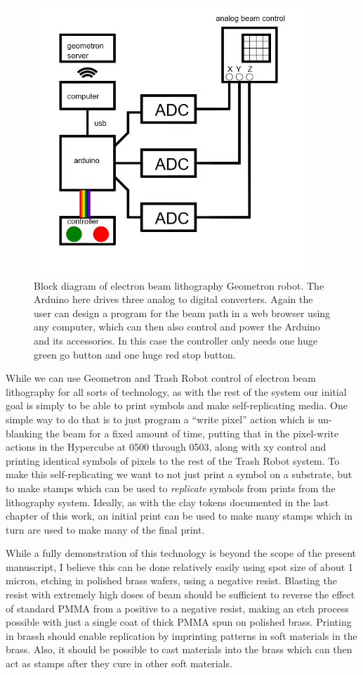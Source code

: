 \begin{figure}
	\centering
	\includegraphics[width=4in]{figures/machines/eblblockdiagram.png}
	\caption[eblblockdiagram]
	{Block diagram of electron beam lithography Geometron robot.  The Arduino here drives three analog to digital converters.  Again the user can design a program for the beam path in a web browser using any computer, which can then also control and power the Arduino and its accessories.  In this case the controller only needs one huge green go button and one huge red stop button.}
\end{figure}

While we can use Geometron and Trash Robot control of electron beam lithography for all sorts of technology, as with the rest of the system our initial goal is simply to be able to print symbols and make self-replicating media.  One simple way to do that is to just program a ``write pixel'' action which is un-blanking the beam for a fixed amount of time, putting that in the pixel-write actions in the Hypercube at 0500 through 0503, along with xy control and printing identical symbols of pixels to the rest of the Trash Robot system.  To make this self-replicating we want to not just print a symbol on a substrate, but to make stamps which can be used to \emph{replicate} symbols from prints from the lithography system.  Ideally, as with the clay tokens documented in the last chapter of this work, an initial print can be used to make many stamps which in turn are used to make many of the final print.  

While a fully demonstration of this technology is beyond the scope of the present manuscript, I believe this can be done relatively easily using spot size of about 1 micron, etching in polished brass wafers, using a negative resist.  Blasting the resist with extremely high doses of beam should be sufficient to reverse the effect of standard PMMA from a positive to a negative resist, making an etch process possible with just a single coat of thick PMMA spun on polished brass.  Printing in brassh should enable replication by imprinting patterns in soft materials in the brass.  Also, it should be possible to cast materials into the brass which can then act as stamps after they cure in other soft materials.  


